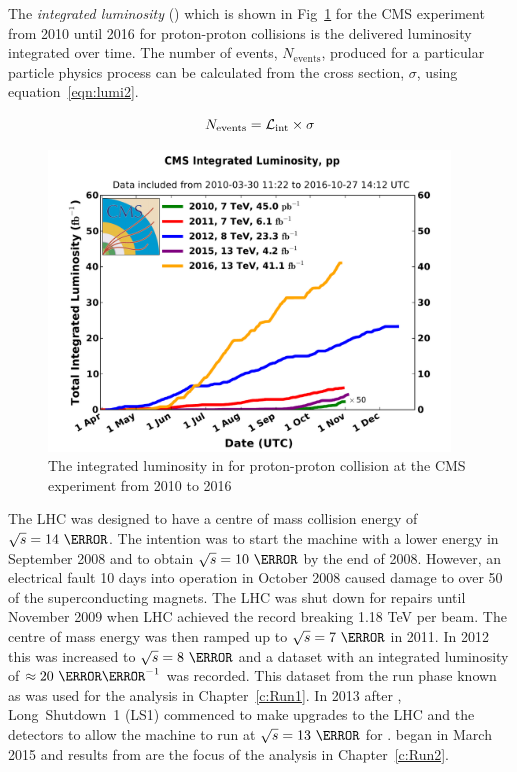 The \emph{integrated luminosity} (\lumiint) which is shown in Fig~\ref{fig:Lumi} for the CMS experiment from 2010 until 2016 for proton-proton collisions is the delivered luminosity integrated over time. The number of events, $N_{\textrm{events}}$, produced for a particular particle physics process can be calculated from the cross section, $\sigma$, using equation~\ref{eqn:lumi2}.

\begin{equation}
N_{\textrm{events}} = \mathcal{L}_{\text{int}} \times \sigma
\label{eqn:lumi2}
\end{equation}

\begin{figure}[ht!]
\centering
    \includegraphics[width=0.95\textwidth]{images/int_lumi_cumulative_pp_2.pdf}
    \caption{The integrated luminosity in \fbinv for proton-proton collision at the CMS experiment from 2010 to 2016}
    \label{fig:Lumi}
\end{figure}

The LHC was designed to have a centre of mass collision energy of $\sqrt{s} = 14~\TeV$. The intention was to start the machine with a lower energy in September 2008 and to obtain $\sqrt{s} = 10~\TeV$ by the end of 2008. However, an electrical fault 10 days into operation in October 2008 caused damage to over 50 of the superconducting magnets. The LHC was shut down for repairs until November 2009 when LHC achieved the record breaking 1.18 TeV per beam. The centre of mass energy was then ramped up to $\sqrt{s} = 7~\TeV$ in 2011. In 2012 this was increased to $\sqrt{s} = 8~\TeV$ and a dataset with an integrated luminosity of $\approx 20~\fbinv$ was recorded. This dataset from the run phase known as \emph{\runone} was used for the analysis in Chapter~\ref{c:Run1}. In 2013 after \runone, Long~Shutdown~1 (LS1) commenced to make upgrades to the LHC and the detectors to allow the machine to run at $\sqrt{s} = 13~\TeV$ for \emph{\runtwo}. \runtwo began in March 2015 and results from \runtwo are the focus of the analysis in Chapter~\ref{c:Run2}.

